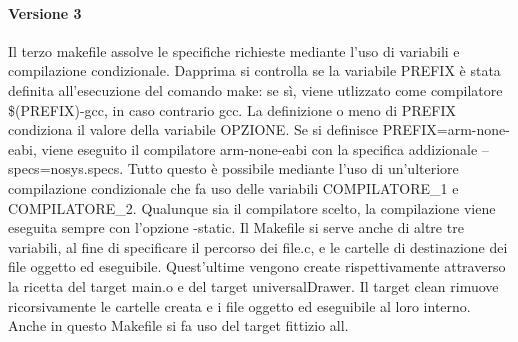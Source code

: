 \documentclass{article}
\begin{document}
		\paragraph*{Versione 3}
                Il terzo makefile assolve le specifiche richieste mediante l'uso di variabili e compilazione condizionale. Dapprima si controlla se la variabile PREFIX è stata definita all'esecuzione del comando make:
                se sì, viene utlizzato come compilatore \$(PREFIX)-gcc, in caso contrario gcc. La definizione o meno di PREFIX condiziona il valore della variabile OPZIONE.
                Se si definisce PREFIX=arm-none-eabi, viene eseguito il compilatore arm-none-eabi con la specifica addizionale --specs=nosys.specs. Tutto questo è possibile mediante l'uso di un'ulteriore
                compilazione condizionale che fa uso delle variabili COMPILATORE\_1 e COMPILATORE\_2.
                Qualunque sia il compilatore scelto, la compilazione viene eseguita sempre con l'opzione -static.
                Il Makefile si serve anche di altre tre variabili, al fine di specificare il percorso dei file.c, e le cartelle di destinazione dei file oggetto ed eseguibile.
                Quest'ultime vengono create rispettivamente attraverso la ricetta del target main.o e del target universalDrawer.
                Il target clean rimuove ricorsivamente le cartelle creata e i file oggetto ed eseguibile al loro interno.
                Anche in questo Makefile si fa uso del target fittizio all.
\end{document}
